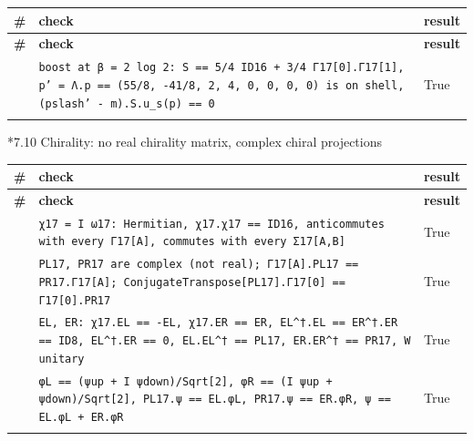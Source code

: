 \documentclass[10pt,a4paper]{article}
\makeatletter
\renewcommand\subsubsection{\@startsection{subsubsection}{3}{\z@}{-3.25ex\@plus -1ex \@minus -.2ex}{1.5ex \@plus .2ex}{\normalfont\normalsize\bfseries\raggedright}}
\makeatother
\begin{document}
{\footnotesize
\begin{longtable}{>{\raggedright\arraybackslash}p{}>{\raggedright\arraybackslash}p{}>{\raggedright\arraybackslash}p{}}
\toprule
\textbf{\#} & \textbf{check} & \textbf{result} \\
\midrule\endfirsthead
\toprule
\textbf{\#} & \textbf{check} & \textbf{result} \\
\midrule\endhead
\endfoot
\bottomrule\endlastfoot
25 & \texttt{boost at β = 2 log 2: S == 5/\allowbreak{}4 ID16 + 3/\allowbreak{}4 Γ17[0].Γ17[1], p' = Λ.p == (55/\allowbreak{}8, -41/\allowbreak{}8, 2, 4, 0, 0, 0, 0) is on shell, (pslash' - m).S.u\_\allowbreak{}s(p) == 0} & True \\*
\end{longtable}}
\subsubsection*{7.10 Chirality: no real chirality matrix, complex chiral projections}
{\footnotesize
\begin{longtable}{>{\raggedright\arraybackslash}p{}>{\raggedright\arraybackslash}p{}>{\raggedright\arraybackslash}p{}}
\toprule
\textbf{\#} & \textbf{check} & \textbf{result} \\
\midrule\endfirsthead
\toprule
\textbf{\#} & \textbf{check} & \textbf{result} \\
\midrule\endhead
\endfoot
\bottomrule\endlastfoot
26 & \texttt{χ17 = I ω17: Hermitian, χ17.χ17 == ID16, anticommutes with every Γ17[A], commutes with every Σ17[A,B]} & True \\
27 & \texttt{PL17, PR17 are complex (not real); Γ17[A].PL17 == PR17.Γ17[A]; ConjugateTranspose[PL17].Γ17[0] == Γ17[0].PR17} & True \\
28 & \texttt{EL, ER: χ17.EL == -EL, χ17.ER == ER, EL\textasciicircum{}†.EL == ER\textasciicircum{}†.ER == ID8, EL\textasciicircum{}†.ER == 0, EL.EL\textasciicircum{}† == PL17, ER.ER\textasciicircum{}† == PR17, W unitary} & True \\
29 & \texttt{φL == (ψup + I ψdown)/\allowbreak{}Sqrt[2], φR == (I ψup + ψdown)/\allowbreak{}Sqrt[2], PL17.ψ == EL.φL, PR17.ψ == ER.φR, ψ == EL.φL + ER.φR} & True \\*
\end{longtable}}
\end{document}
